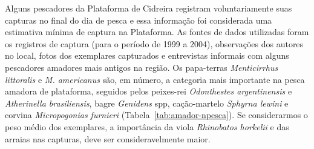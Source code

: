 \documentclass[a4paper,11pt,twoside,showtrims,onecolumn,openright,final]{memoir}
\begin{document}

Alguns pescadores da Plataforma de Cidreira registram voluntariamente suas capturas no final 
do dia de pesca e essa informação foi considerada uma estimativa mínima de captura na Plataforma. 
As fontes de dados utilizadas foram os registros de captura (para o período de 1999 a 2004), 
observações dos autores no local, fotos dos exemplares capturados e entrevistas informais com alguns 
pescadores amadores mais antigos na região. Os papa-terras \emph{Menticirrhus littoralis} e \emph{M. americanus} são, 
em número, a categoria mais importante na pesca amadora de plataforma, seguidos pelos peixes-rei 
\emph{Odonthestes argentinensis} e \emph{Atherinella brasiliensis}, bagre \emph{Genidens} spp, cação-martelo 
\emph{Sphyrna lewini} e corvina \emph{Micropogonias furnieri} (Tabela~\ref{tab:amador-npesca}). 
Se considerarmos o peso médio dos exemplares, a importância da viola \emph{Rhinobatos horkelii} e 
das arraias nas capturas, deve ser consideravelmente maior.

%
%
\end{document}
